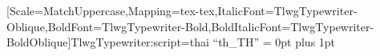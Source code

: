   \usepackage{fontspec}
  \usepackage{polyglossia}
  \usepackage[Latin,Thai]{ucharclasses}
  \setdefaultlanguage{thai}
  \newfontfamily{\thaifont}[Scale=MatchUppercase,Mapping=tex-tex,ItalicFont={TlwgTypewriter-Oblique},BoldFont={TlwgTypewriter-Bold},BoldItalicFont={TlwgTypewriter-BoldOblique}]{TlwgTypewriter:script=thai}
  \XeTeXlinebreaklocale “th_TH”
  \XeTeXlinebreakskip = 0pt plus 1pt
  \linespread{1.5}

\usepackage{todonotes}


  \frontmatter
